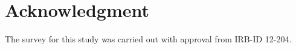 %


\appendices
%


\section*{Acknowledgment}


The survey for this study was carried out with approval from  IRB-ID 12-204.


\ifCLASSOPTIONcaptionsoff
  \newpage
\fi



